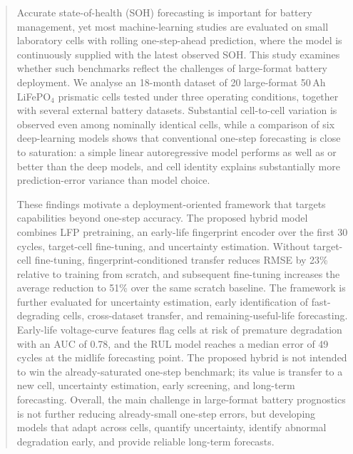 \documentclass[a4paper,fleqn]{cas-dc}
\begin{document}
\begin{abstract}
Accurate state-of-health (SOH) forecasting is important for battery management, yet
most machine-learning studies are evaluated on small laboratory cells with rolling
one-step-ahead prediction, where the model is continuously supplied with the latest
observed SOH. This study examines whether such benchmarks reflect the challenges of
large-format battery deployment. We analyse an 18-month dataset of 20 large-format
50\,Ah LiFePO$_4$ prismatic cells tested under three operating conditions, together
with several external battery datasets. Substantial cell-to-cell variation is
observed even among nominally identical cells, while a comparison of six
deep-learning models shows that conventional one-step forecasting is close to
saturation: a simple linear autoregressive model performs as well as or better than
the deep models, and cell identity explains substantially more prediction-error
variance than model choice.

These findings motivate a deployment-oriented framework that targets capabilities
beyond one-step accuracy. The proposed hybrid model combines LFP pretraining, an
early-life fingerprint encoder over the first 30 cycles, target-cell fine-tuning, and
uncertainty estimation. Without target-cell fine-tuning, fingerprint-conditioned
transfer reduces RMSE by 23\% relative to training from scratch, and subsequent
fine-tuning increases the average reduction to 51\% over the same scratch baseline.
The framework is further evaluated for uncertainty estimation, early identification
of fast-degrading cells, cross-dataset transfer, and remaining-useful-life
forecasting. Early-life voltage-curve features flag cells at risk of premature
degradation with an AUC of 0.78, and the RUL model reaches a median error of 49
cycles at the midlife forecasting point. The proposed hybrid is not intended to win
the already-saturated one-step benchmark; its value is transfer to a new cell,
uncertainty estimation, early screening, and long-term forecasting. Overall, the main
challenge in large-format battery prognostics is not further reducing already-small
one-step errors, but developing models that adapt across cells, quantify uncertainty,
identify abnormal degradation early, and provide reliable long-term forecasts.
\end{abstract}
\end{document}
